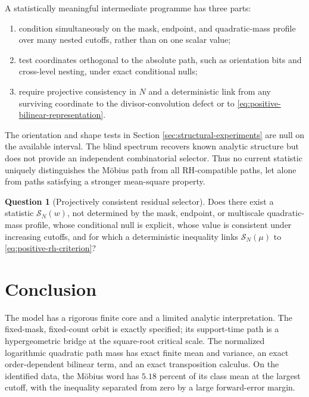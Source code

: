\documentclass[11pt,reqno]{amsart}
\numberwithin{equation}{section}
\theoremstyle{plain}
\theoremstyle{definition}
\newtheorem{question}[theorem]{Question}
\theoremstyle{remark}
\begin{document}
A statistically meaningful intermediate programme has three parts:
\begin{enumerate}[label=(\roman*)]
\item condition simultaneously on the mask, endpoint, and quadratic-mass
profile over many nested cutoffs, rather than on one scalar value;
\item test coordinates orthogonal to the absolute path, such as orientation
bits and cross-level nesting, under exact conditional nulls;
\item require projective consistency in \(N\) and a deterministic link from
any surviving coordinate to the divisor-convolution defect or to
\eqref{eq:positive-bilinear-representation}.
\end{enumerate}
The orientation and shape tests in Section \ref{sec:structural-experiments}
are null on the available interval.  The blind spectrum recovers known
analytic structure but does not provide an independent combinatorial
selector.  Thus no current statistic uniquely distinguishes the M\"obius
path from all RH-compatible paths, let alone from paths satisfying a stronger
mean-square property.

\begin{question}[Projectively consistent residual selector]
\label{ques:projective-selector}
Does there exist a statistic \(\mathcal S_N(w)\), not determined by the mask,
endpoint, or multiscale quadratic-mass profile, whose conditional null is
explicit, whose value is consistent under increasing cutoffs, and for which a
deterministic inequality links \(\mathcal S_N(\mu)\) to
\eqref{eq:positive-rh-criterion}?
\end{question}

\section{Conclusion}
\label{sec:conclusion}

The model has a rigorous finite core and a limited analytic interpretation.
The fixed-mask, fixed-count orbit is exactly specified; its support-time path
is a hypergeometric bridge at the square-root critical scale.  The normalized
logarithmic quadratic path mass has exact finite mean and variance, an exact
order-dependent bilinear term, and an exact transposition calculus.  On the
identified data, the M\"obius word has \(5.18\) percent of its class mean at
the largest cutoff, with the inequality separated from zero by a large
forward-error margin.
\end{document}
